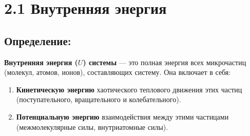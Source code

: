 \documentclass[a4paper,12pt]{article}
\begin{document}
\begin{center}
\end{center}

\vspace{-2.5em}









\section*{2.1 Внутренняя энергия}

\vspace{-9pt}
\subsection*{Определение:}
\vspace{-3pt}
\textbf{Внутренняя энергия ($U$) системы} --- это полная энергия всех микрочастиц (молекул, атомов, ионов), составляющих систему. Она включает в себя:
\begin{enumerate} [itemsep=0pt, topsep=0pt, parsep=0pt]
    \item \textbf{Кинетическую энергию} хаотического теплового движения этих частиц (поступательного, вращательного и колебательного).
    \item \textbf{Потенциальную энергию} взаимодействия между этими частицами (межмолекулярные силы, внутриатомные силы).
\end{enumerate}

\vspace{-9pt}
\end{document}
